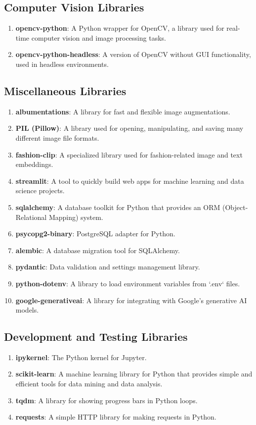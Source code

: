 \subsection*{Computer Vision Libraries}
\begin{enumerate}
    \setlength\itemsep{-1.05em}
    \item \textbf{opencv-python}: A Python wrapper for OpenCV, a library used for real-time computer vision and image processing tasks.
    \item \textbf{opencv-python-headless}: A version of OpenCV without GUI functionality, used in headless environments.
\end{enumerate}

\subsection*{Miscellaneous Libraries}
\begin{enumerate}
    \setlength\itemsep{-1.05em}
    \item \textbf{albumentations}: A library for fast and flexible image augmentations.
    \item \textbf{PIL (Pillow)}: A library used for opening, manipulating, and saving many different image file formats.
    \item \textbf{fashion-clip}: A specialized library used for fashion-related image and text embeddings.
    \item \textbf{streamlit}: A tool to quickly build web apps for machine learning and data science projects.
    \item \textbf{sqlalchemy}: A database toolkit for Python that provides an ORM (Object-Relational Mapping) system.
    \item \textbf{psycopg2-binary}: PostgreSQL adapter for Python.
    \item \textbf{alembic}: A database migration tool for SQLAlchemy.
    \item \textbf{pydantic}: Data validation and settings management library.
    \item \textbf{python-dotenv}: A library to load environment variables from `.env` files.
    \item \textbf{google-generativeai}: A library for integrating with Google's generative AI models.
\end{enumerate}

\subsection*{Development and Testing Libraries}
\begin{enumerate}
    \setlength\itemsep{-1.05em}
    \item \textbf{ipykernel}: The Python kernel for Jupyter.
    \item \textbf{scikit-learn}: A machine learning library for Python that provides simple and efficient tools for data mining and data analysis.
    \item \textbf{tqdm}: A library for showing progress bars in Python loops.
    \item \textbf{requests}: A simple HTTP library for making requests in Python.
\end{enumerate}

